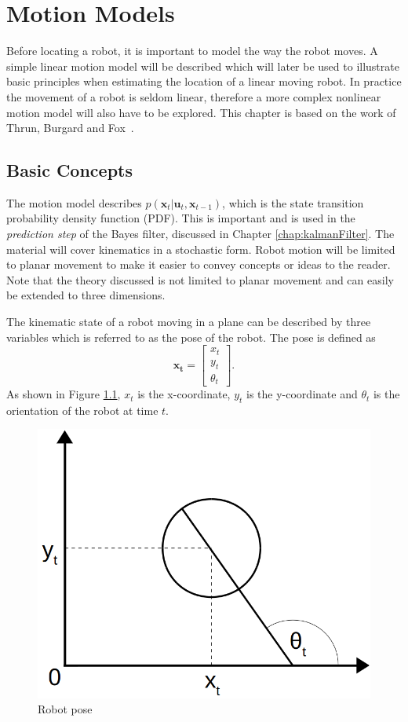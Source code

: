 \documentclass[12pt,oneside,openany,a4paper, %
afrikaans,english,
]{memoir}
\numberwithin{equation}{chapter}
\begin{document}
\chapter{Motion Models}\label{chap:motionModel}
Before locating a robot, it is important to model the way the robot moves. A simple linear motion model will be described which will later be used to illustrate basic principles when estimating the location of a linear moving robot. In practice the movement of a robot is seldom linear, therefore a more complex nonlinear motion model will also have to be explored. This chapter is based on the work of Thrun, Burgard and Fox~\citep{thrun}.
\section{Basic Concepts}
The motion model describes $p(\bm{x}_t|\bm{u}_t,\bm{x}_{t-1})$, which is the state transition probability density function (PDF). This is important and is used in the \textit{prediction step} of the Bayes filter, discussed in Chapter \ref{chap:kalmanFilter}. The material will cover kinematics in a stochastic form. Robot motion will be limited to planar movement to make it easier to convey concepts or ideas to the reader. Note that the theory discussed is not limited to planar movement and can easily be extended to three dimensions.

The kinematic state of a robot moving in a plane can be described by three variables which is referred to as the pose of the robot.
The pose is defined as
\begin{equation}
\bm{x_t} =
\begin{bmatrix}
x_t\\
y_t\\
\theta_t
\end{bmatrix}.
\end{equation}
As shown in Figure \ref{fig:pose_robot}, $x_t$ is the x-coordinate, $y_t$ is the y-coordinate and $\theta_t$ is the orientation of the robot at time $t$.

\begin{figure}[H]
  \includegraphics[width=0.4\linewidth]{Figures/pose_robot.png}
  \centering
  \caption{Robot pose}
  \label{fig:pose_robot}
\end{figure}
\end{document}
